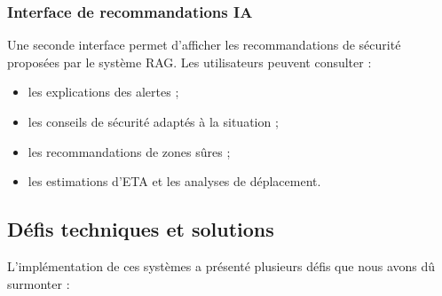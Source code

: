 \subsubsection{Interface de recommandations IA}

Une seconde interface permet d’afficher les recommandations de sécurité proposées par le système RAG. Les utilisateurs peuvent consulter :

\begin{itemize}
    \item les explications des alertes ;
    
    \item les conseils de sécurité adaptés à la situation ;
    
    \item les recommandations de zones sûres ;
    
    \item les estimations d’ETA et les analyses de déplacement.
\end{itemize}


\subsection{Défis techniques et solutions}
L'implémentation de ces systèmes a présenté plusieurs défis que nous avons dû surmonter :

